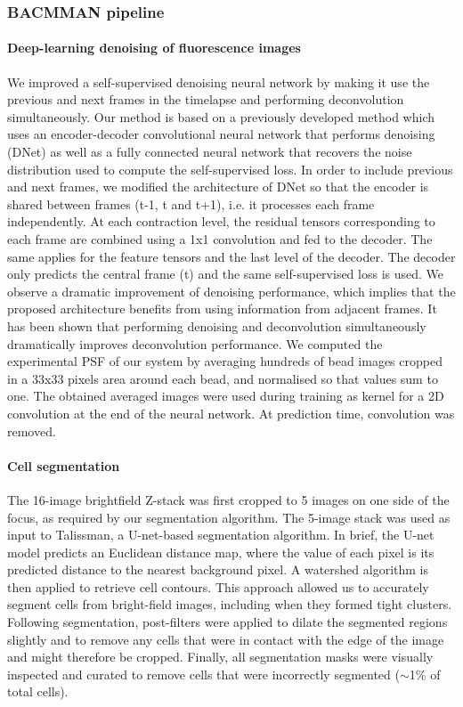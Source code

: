 \subsubsection*{BACMMAN pipeline}
\paragraph*{Deep-learning denoising of fluorescence images}
We improved a self-supervised denoising neural network by making it use the previous and next frames in the timelapse and performing deconvolution simultaneously. Our method is based on a previously developed method \cite{Ollion2021} which uses an encoder-decoder convolutional neural network that performs denoising (DNet) as well as a fully connected neural network that recovers the noise distribution used to compute the self-supervised loss. In order to include previous and next frames, we modified the architecture of DNet so that the encoder is shared between frames (t-1, t and t+1), i.e. it processes each frame independently. At each contraction level, the residual tensors corresponding to each frame are combined using a 1x1 convolution and fed to the decoder. The same applies for the feature tensors and the last level of the decoder. The decoder only predicts the central frame (t) and the same self-supervised loss is used. We observe a dramatic improvement of denoising performance, which implies that the proposed architecture benefits from using information from adjacent frames. It has been shown that performing denoising and deconvolution simultaneously dramatically improves deconvolution performance\cite{Kobayashi2020}. We computed the experimental PSF of our system by averaging hundreds of bead images cropped in a 33x33 pixels area around each bead, and normalised so that values sum to one. The obtained averaged images were used during training as kernel for a 2D convolution at the end of the neural network. At prediction time, convolution was removed.

\paragraph{Cell segmentation}
The 16-image brightfield Z-stack was first cropped to 5 images on one side of the focus, as required by our segmentation algorithm. The 5-image stack was used as input to Talissman, a U-net-based segmentation algorithm. In brief, the U-net model predicts an Euclidean distance map, where the value of each pixel is its predicted distance to the nearest background pixel. A watershed algorithm is then applied to retrieve cell contours. This approach allowed us to accurately segment cells from bright-field images, including when they formed tight clusters. Following segmentation, post-filters were applied to dilate the segmented regions slightly and to remove any cells that were in contact with the edge of the image and might therefore be cropped. Finally, all segmentation masks were visually inspected and curated to remove cells that were incorrectly segmented ($\sim$1\% of total cells).

